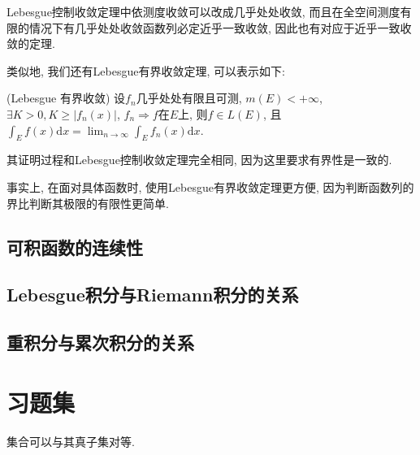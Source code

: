 \documentclass[theorem=false,mathfont=none,openany,sub3section]{easybook}
\begin{document}
\begin{remark}
  Lebesgue控制收敛定理中依测度收敛可以改成几乎处处收敛, 而且在全空间测度有限的情况下有几乎处处收敛函数列必定近乎一致收敛, 因此也有对应于近乎一致收敛的定理.\par
\end{remark}

类似地, 我们还有Lebesgue有界收敛定理, 可以表示如下:\par

\begin{corollary}
  (Lebesgue 有界收敛) 设$f_n$几乎处处有限且可测, $m(E)<+\infty$, $\exists K >0, K\geqslant |f_n(x)|$, $f_n\Rightarrow f$在$E$上, 则$f\in L(E)$, 且$\int_{E}f(x)\mathrm{d}x=\lim_{n\to \infty} \int_{E}f_n(x)\mathrm{d}x$.\par
\end{corollary}

\begin{remark}
  其证明过程和Lebesgue控制收敛定理完全相同, 因为这里要求有界性是一致的.\par
  事实上, 在面对具体函数时, 使用Lebesgue有界收敛定理更方便, 因为判断函数列的界比判断其极限的有限性更简单.\par
\end{remark}

\newpage

\section{可积函数的连续性}


\newpage

\section{Lebesgue积分与Riemann积分的关系}

\newpage

\section{重积分与累次积分的关系}


\newpage

\chapter{习题集}

\begin{example}
  集合可以与其真子集对等.
\end{example}
\end{document}
